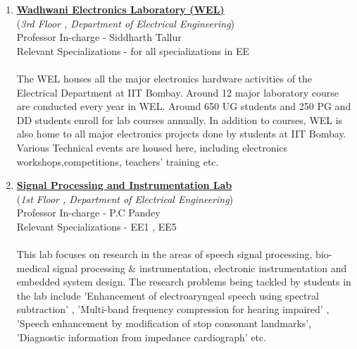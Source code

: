 \documentclass[openany]{book} %
\begin{document}
\begin{enumerate}
    \item \href{https://www.ee.iitb.ac.in/~wel_iitb/}{\color{blue}  \textbf{Wadhwani Electronics Laboratory (WEL)}}\\
    (\textit{3rd Floor ,  Department of Electrical Engineering})\\
    Professor In-charge - Siddharth Tallur\\
Relevant Specializations - for all specializations in EE\\
\\
The WEL houses all the major electronics hardware activities of the Electrical Department at IIT Bombay. Around 12 major laboratory course are conducted every year in WEL. Around 650 UG students and 250 PG and DD students enroll for lab courses annually. In addition to courses, WEL is also home to all major electronics projects done by students at IIT Bombay. Various Technical events are housed here, including electronics workshops,competitions, teachers' training etc.\\

\item \href{http://www.ee.iitb.ac.in/~spilab} {\color{blue}  \textbf{Signal Processing and Instrumentation Lab} }\\
    (\textit{1st Floor ,  Department of Electrical Engineering})\\
    Professor In-charge - P.C Pandey\\
Relevant Specializations - EE1 , EE5\\
\\
This lab focuses on research in the areas of speech signal processing, bio-medical signal processing & instrumentation, electronic instrumentation and embedded system design. The research problems being tackled by students in the lab include 'Enhancement of electroaryngeal speech using spectral subtraction' , 'Multi-band frequency compression for hearing impaired' , 'Speech enhancement by modification of stop consonant landmarks', 'Diagnostic information from impedance cardiograph' etc.\\



\end{enumerate}
\end{document}
